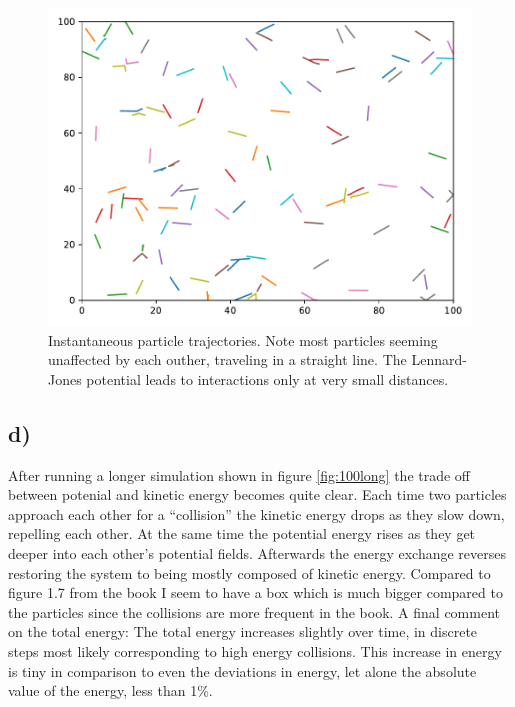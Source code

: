 \documentclass[a4paper, 12pt]{article}
\begin{document}
\begin{figure}[h!]
    \centering
    \includegraphics[width=0.7 \linewidth]{../Two-Dimensional-Gas/figures/100_particles_short.pdf}
    \caption{Instantaneous particle trajectories. Note most particles seeming unaffected by each outher, traveling in a straight line. The Lennard-Jones potential leads to interactions only at very small distances.}
    \label{fig:100short}
\end{figure}

\newpage

\subsection*{d)}
After running a longer simulation shown in figure \ref{fig:100long} the trade off between potenial and kinetic energy becomes quite clear. Each time two particles approach each other for a ``collision'' the kinetic energy drops as they slow down, repelling each other. At the same time the potential energy rises as they get deeper into each other's potential fields. Afterwards the energy exchange reverses restoring the system to being mostly composed of kinetic energy. Compared to figure 1.7 from the book I seem to have a box which is much bigger compared to the particles since the collisions are more frequent in the book. A final comment on the total energy: The total energy increases slightly over time, in discrete steps most likely corresponding to high energy collisions. This increase in energy is tiny in comparison to even the deviations in energy, let alone the absolute value of the energy, less than 1\%.
\end{document}
